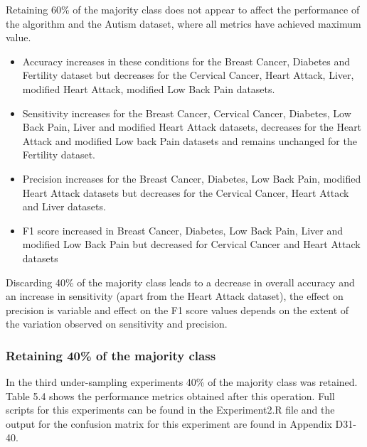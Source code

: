 Retaining 60\% of the majority class does not appear to affect the performance of the algorithm and the Autism dataset, where all metrics have achieved maximum value.
\begin{itemize}
    \item Accuracy increases in these conditions for the Breast Cancer, Diabetes and Fertility dataset but decreases for the Cervical Cancer, Heart Attack, Liver, modified Heart Attack, modified Low Back Pain datasets.
    \item Sensitivity increases for the Breast Cancer, Cervical Cancer, Diabetes, Low Back Pain, Liver and modified Heart Attack datasets, decreases for the Heart Attack and modified Low back Pain datasets and remains unchanged for the Fertility dataset.
    \item Precision increases for the Breast Cancer, Diabetes, Low Back Pain, modified Heart Attack datasets but decreases for the Cervical Cancer, Heart Attack and Liver datasets.
    \item F1 score increased in Breast Cancer, Diabetes, Low Back Pain, Liver and modified Low Back Pain but decreased for Cervical Cancer and Heart Attack datasets
\end{itemize}

Discarding 40\% of the majority class leads to a decrease in overall accuracy  and an increase in sensitivity (apart from the Heart Attack dataset), the effect on precision is variable and effect on the F1 score values depends on the extent of the variation observed on sensitivity and precision.

\subsubsection{Retaining 40\% of the majority class}
In the third under-sampling experiments 40\% of the majority class was retained. Table 5.4 shows the performance metrics obtained after this operation. Full scripts for this experiments can be found in the Experiment2.R file and the output for the confusion matrix for this experiment are found in Appendix D31-40.

